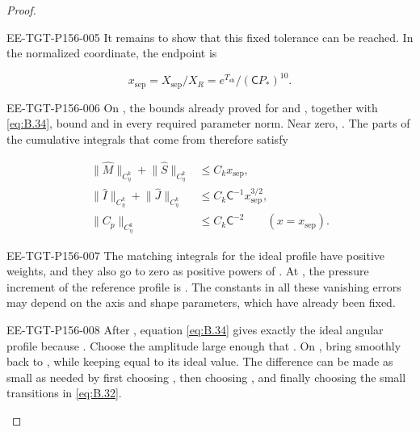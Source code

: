 \begin{proof}
\begin{EESegment}{EE-TGT-P156-005}
It remains to show that this fixed tolerance can be reached. In the normalized coordinate, the
endpoint  is
\end{EESegment}
\begin{equation}
  x_{\mathrm{sep}}=X_{\mathrm{sep}}/X_R=e^{T_{\mathrm{sh}}}/(\mathsf C P_*)^{10}.
\tag{B.38}\label{eq:B.38}
\end{equation}
\begin{EESegment}{EE-TGT-P156-006}
On , the bounds already proved for
 and
, together with \eqref{eq:B.34}, bound
 and  in every required parameter norm.
Near zero, . The parts of the cumulative integrals that
come from  therefore satisfy
\end{EESegment}
\begin{equation}
\begin{aligned}
  \lVert\widehat M\rVert_{C_\eta^k}+\lVert\widehat S\rVert_{C_\eta^k}
    &\leq C_kx_{\mathrm{sep}},\\
  \lVert\widehat I\rVert_{C_\eta^k}+\lVert\widehat J\rVert_{C_\eta^k}
    &\leq C_k\mathsf C^{-1}x_{\mathrm{sep}}^{3/2},\\
  \lVert C_p\rVert_{C_\eta^k}
    &\leq C_k\mathsf C^{-2}\qquad(x=x_{\mathrm{sep}}).
\end{aligned}
\tag{B.39}\label{eq:B.39}
\end{equation}
\begin{EESegment}{EE-TGT-P156-007}
The matching integrals for the ideal profile have positive weights, and they also go to zero as
positive powers of . At
, the pressure increment of the reference profile is
. The constants in all
these vanishing errors may depend on the axis and shape parameters, which have already been fixed.
\end{EESegment}

\begin{EESegment}{EE-TGT-P156-008}
After , equation \eqref{eq:B.34} gives exactly the ideal
angular profile because
. Choose the amplitude large
enough that . On
, bring  smoothly back to
, while keeping  equal to its ideal value. The
difference  can be made as small as needed by first choosing
, then choosing , and finally choosing the
small transitions in \eqref{eq:B.32}.
\end{EESegment}


\end{proof}
